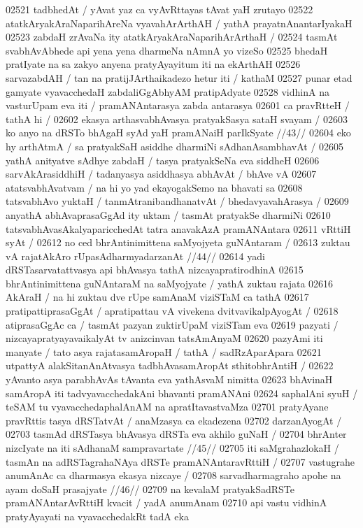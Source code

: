 02521 tadbhedAt / yAvat yaz ca vyAvRttayas tAvat yaH zrutayo
02522 atatkAryakAraNaparihAreNa vyavahArArthAH / yathA prayatnAnantarIyakaH
02523 zabdaH zrAvaNa ity atatkAryakAraNaparihArArthaH / 
02524 tasmAt svabhAvAbhede api yena yena dharmeNa nAmnA yo vizeSo
02525 bhedaH pratIyate na sa zakyo anyena pratyAyayitum iti na ekArthAH 
02526 sarvazabdAH / tan na pratijJArthaikadezo hetur iti / kathaM
02527 punar etad gamyate vyavacchedaH zabdaliGgAbhyAM pratipAdyate 
02528 vidhinA na vasturUpam eva iti / pramANAntarasya zabda antarasya 
02601 ca pravRtteH / tathA hi /
02602 	ekasya arthasvabhAvasya pratyakSasya sataH svayam / 
02603 	ko anyo na dRSTo bhAgaH syAd yaH pramANaiH parIkSyate //43//
02604 eko hy arthAtmA / sa pratyakSaH asiddhe dharmiNi sAdhanAsambhavAt /
02605 yathA anityatve sAdhye zabdaH / tasya pratyakSeNa eva siddheH  
02606 sarvAkArasiddhiH / tadanyasya asiddhasya abhAvAt / bhAve vA  
02607 atatsvabhAvatvam / na hi yo yad ekayogakSemo na bhavati sa  
02608 tatsvabhAvo yuktaH / tanmAtranibandhanatvAt / bhedavyavahArasya / 
02609 anyathA abhAvaprasaGgAd ity uktam / tasmAt pratyakSe dharmiNi  
02610 tatsvabhAvasAkalyaparicchedAt tatra anavakAzA pramANAntara 
02611 vRttiH syAt /
02612 	no ced bhrAntinimittena saMyojyeta guNAntaram /
02613 	zuktau vA rajatAkAro rUpasAdharmyadarzanAt //44// 
02614 yadi dRSTasarvatattvasya api bhAvasya tathA nizcayapratirodhinA  
02615 bhrAntinimittena guNAntaraM na saMyojyate / yathA zuktau rajata  
02616 AkAraH / na hi zuktau dve rUpe samAnaM viziSTaM ca tathA 
02617 pratipattiprasaGgAt / apratipattau vA vivekena dvitvavikalpAyogAt /
02618 atiprasaGgAc ca / tasmAt pazyan zuktirUpaM viziSTam eva
02619 pazyati / nizcayapratyayavaikalyAt tv anizcinvan tatsAmAnyaM  
02620 pazyAmi iti manyate / tato asya rajatasamAropaH / tathA / sadRzAparApara
02621 utpattyA alakSitanAnAtvasya tadbhAvasamAropAt sthitobhrAntiH / 
02622 yAvanto asya parabhAvAs tAvanta eva yathAsvaM nimitta
02623 bhAvinaH samAropA iti tadvyavacchedakAni bhavanti pramANAni  
02624 saphalAni syuH / teSAM tu vyavacchedaphalAnAM na apratItavastvaMza
02701 pratyAyane pravRttis tasya dRSTatvAt / anaMzasya ca ekadezena 
02702 darzanAyogAt /
02703 	tasmAd dRSTasya bhAvasya dRSTa eva akhilo guNaH /
02704 	bhrAnter nizcIyate na iti sAdhanaM sampravartate //45//  
02705 iti saMgrahazlokaH / tasmAn na adRSTagrahaNAya dRSTe pramANAntaravRttiH /
02707 	vastugrahe anumAnAc ca dharmasya ekasya nizcaye /  
02708 	sarvadharmagraho apohe na ayam doSaH prasajyate //46// 
02709 na kevalaM pratyakSadRSTe pramANAntarAvRttiH kvacit / yadA anumAnam
02710 api vastu vidhinA pratyAyayati na vyavacchedakRt tadA eka
